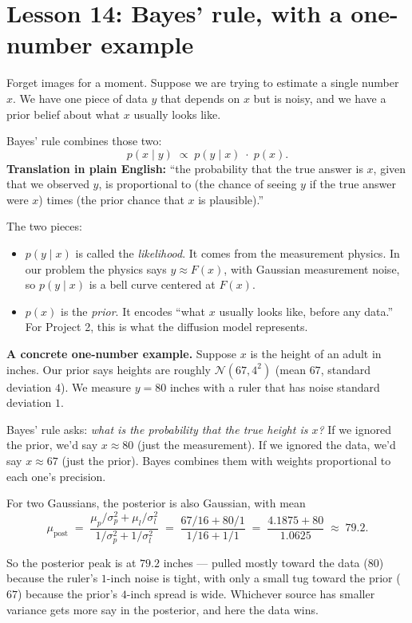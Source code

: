 \documentclass[11pt]{article}
\begin{document}
\section{Lesson 14: Bayes' rule, with a one-number example}

Forget images for a moment. Suppose we are trying to estimate a single
number $x$. We have one piece of data $y$ that depends on $x$ but is
noisy, and we have a prior belief about what $x$ usually looks like.

Bayes' rule combines those two:
\[
p(x \mid y) \;\propto\; p(y \mid x) \;\cdot\; p(x).
\]
\textbf{Translation in plain English:} ``the probability that the true
answer is $x$, given that we observed $y$, is proportional to (the
chance of seeing $y$ if the true answer were $x$) times (the prior
chance that $x$ is plausible).''

The two pieces:
\begin{itemize}[leftmargin=2em]
\item $p(y \mid x)$ is called the \emph{likelihood}. It comes from the
  measurement physics. In our problem the physics says $y \approx F(x)$,
  with Gaussian measurement noise, so $p(y \mid x)$ is a bell curve
  centered at $F(x)$.
\item $p(x)$ is the \emph{prior}. It encodes ``what $x$ usually looks
  like, before any data.'' For Project 2, this is what the diffusion
  model represents.
\end{itemize}

\textbf{A concrete one-number example.} Suppose $x$ is the height of an
adult in inches. Our prior says heights are roughly $\mathcal{N}(67, 4^2)$
(mean $67$, standard deviation $4$). We measure $y = 80$ inches with a
ruler that has noise standard deviation $1$.

Bayes' rule asks: \emph{what is the probability that the true height is $x$?}
If we ignored the prior, we'd say $x \approx 80$ (just the measurement).
If we ignored the data, we'd say $x \approx 67$ (just the prior). Bayes
combines them with weights proportional to each one's precision.

For two Gaussians, the posterior is also Gaussian, with mean
\[
\mu_{\text{post}} \;=\;
\frac{\mu_p / \sigma_p^2 + \mu_l / \sigma_l^2}{1/\sigma_p^2 + 1/\sigma_l^2}
\;=\;
\frac{67/16 + 80/1}{1/16 + 1/1}
\;=\;
\frac{4.1875 + 80}{1.0625}
\;\approx\;
79.2.
\]

So the posterior peak is at $79.2$ inches --- pulled mostly toward the
data ($80$) because the ruler's $1$-inch noise is tight, with only a
small tug toward the prior ($67$) because the prior's $4$-inch spread is
wide. Whichever source has smaller variance gets more say in the
posterior, and here the data wins.
\end{document}
